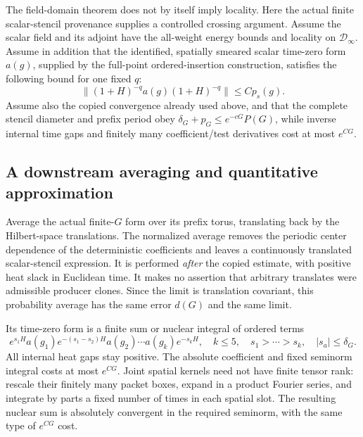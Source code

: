 The field-domain theorem does not by itself imply locality.  Here the
actual finite scalar-stencil provenance supplies a controlled crossing
argument.  Assume the scalar field and its adjoint have the all-weight
energy bounds and locality on $\mathcal D_\infty$.  Assume in addition
that the identified, spatially smeared scalar time-zero form $a(g)$,
supplied by the full-point ordered-insertion construction, satisfies
the following bound for one fixed $q$:
\begin{equation}
 \|(1+H)^{-q}a(g)(1+H)^{-q}\|\leq Cp_s(g).
 \label{ha:scalar-form-bound}
\end{equation}
Assume also the copied convergence already used above, and that the
complete stencil diameter and prefix period obey
$\delta_G+p_G\leq e^{-cG}P(G)$, while inverse internal time gaps and
finitely many coefficient/test derivatives cost at most $e^{CG}$.

\subsection{A downstream averaging and quantitative approximation}

Average the actual finite-$G$ form over its prefix torus, translating
back by the Hilbert-space translations.  The normalized average removes
the periodic center dependence of the deterministic coefficients and
leaves a continuously translated scalar-stencil expression.  It is
performed \emph{after} the copied estimate, with positive heat slack in
Euclidean time.  It makes no assertion that arbitrary translates were
admissible producer clones.  Since the limit is translation covariant,
this probability average has the same error $d(G)$ and the same limit.

Its time-zero form is a finite sum or nuclear integral of ordered terms
\begin{equation}
 e^{s_1H}a(g_1)e^{-(s_1-s_2)H}a(g_2)\cdots
                           a(g_k)e^{-s_kH},
 \quad k\leq5,\quad s_1>\cdots>s_k,\quad |s_a|\leq\delta_G.
 \label{ha:stencil}
\end{equation}
All internal heat gaps stay positive.  The absolute coefficient and
fixed seminorm integral costs at most $e^{CG}$.  Joint spatial kernels
need not have finite tensor rank: rescale their finitely many packet
boxes, expand in a product Fourier series, and integrate by parts a
fixed number of times in each spatial slot.  The resulting nuclear
sum is absolutely convergent in the required seminorm, with the same
type of $e^{CG}$ cost.

